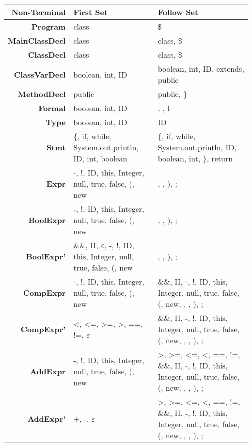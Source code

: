 \documentclass{report}
\begin{document}
%
\begin{tabularx}{\textwidth}{ r | R | R }

\textbf{Non-Terminal} & \textbf{First Set} & \textbf{Follow Set} \\
\hline
\textbf{Program} & class & \$ \\[1ex]
\textbf{MainClassDecl} & class & class, \$\\[1ex]
\textbf{ClassDecl} & class & class, \$\\[1ex] 
\textbf{ClassVarDecl} 
& boolean, int, ID 
& boolean, int, ID, extends, public 
\\[1ex]

\textbf{MethodDecl} 
& public 
& public, \}
\\[1ex]

\textbf{Formal} 
& boolean, int, ID 
& , , I
\\[1ex] 

\textbf{Type} 
& boolean, int, ID 
& ID 
\\[1ex]

\textbf{Stmt} 
& \{, if, while, System.out.println, ID, int, boolean 
& \{, if, while, System.out.println, ID, boolean, int, \}, return 
\\[1ex]

\textbf{Expr} 
& -, !, ID, this, Integer, null, true, false, (, new 
& , , ), ; 
\\[1ex]

\textbf{BoolExpr} 
& -, !, ID, this, Integer, null, true, false, (, new 
& , , ), ; 
\\[1ex]

\textbf{BoolExpr'} 
& \&\&, II, $\varepsilon$, -, !, ID, this, Integer, null, true, false, (, new 
& , , ), ; 
\\[1ex]

\textbf{CompExpr} 
& -, !, ID, this, Integer, null, true, false, (, new 
& \&\&, II, -, !, ID, this, Integer, null, true, false, (, new, , , ), ; 
\\[1ex]

\textbf{CompExpr'} 
& <, <=, >=, >, ==, !=, $\varepsilon$ 
& \&\&, II, -, !, ID, this, Integer, null, true, false, (, new, , , ), ; 
\\[1ex]

\textbf{AddExpr} 
& -, !, ID, this, Integer, null, true, false, (, new 
& >, >=, <=, <, ==, !=, \&\&, II, -, !, ID, this, Integer, null, true, false, (, new, , , ), ; 
\\[1ex]

\textbf{AddExpr'} 
& +, -, $\varepsilon$ 
& >, >=, <=, <, ==, !=, \&\&, II, -, !, ID, this, Integer, null, true, false, (, new, , , ), ; 
\\[1ex]


\end{tabularx}
\end{document}
